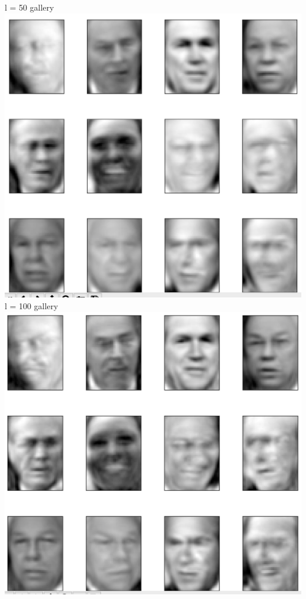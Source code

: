 \documentclass[11pt]{article}
\begin{document}
\begin{enumerate}
{l = 50 gallery \newline{}
\includegraphics[scale = 0.6]{pca_l=50.png} \newline{} \newpage
l = 100 gallery \newline{}
\includegraphics[scale = 0.6]{pca_l=100.png} \newline{} \newpage
}
\end{enumerate}
\end{document}
